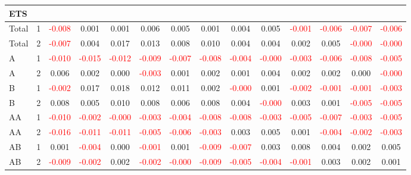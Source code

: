 \begin{table}[!htb]
{\begin{tabular}{llcccccccccccc}
\hline
ETS &  &  &  &  &  &  &  &  &  &  &  &  & \\
\hline
Total & 1 & \textcolor{red}{-0.008} & 0.001 & 0.001 & 0.006 & 0.005 & 0.001 & 0.004 & 0.005 & \textcolor{red}{-0.001} & \textcolor{red}{-0.006} & \textcolor{red}{-0.007} & \textcolor{red}{-0.006}\\
Total & 2 & \textcolor{red}{-0.007} & 0.004 & 0.017 & 0.013 & 0.008 & 0.010 & 0.004 & 0.004 & 0.002 & 0.005 & \textcolor{red}{-0.000} & \textcolor{red}{-0.000}\\
A & 1 & \textcolor{red}{-0.010} & \textcolor{red}{-0.015} & \textcolor{red}{-0.012} & \textcolor{red}{-0.009} & \textcolor{red}{-0.007} & \textcolor{red}{-0.008} & \textcolor{red}{-0.004} & \textcolor{red}{-0.000} & \textcolor{red}{-0.003} & \textcolor{red}{-0.006} & \textcolor{red}{-0.008} & \textcolor{red}{-0.005}\\
A & 2 & 0.006 & 0.002 & 0.000 & \textcolor{red}{-0.003} & 0.001 & 0.002 & 0.001 & 0.004 & 0.002 & 0.002 & 0.000 & \textcolor{red}{-0.000}\\
B & 1 & \textcolor{red}{-0.002} & 0.017 & 0.018 & 0.012 & 0.011 & 0.002 & \textcolor{red}{-0.000} & 0.001 & \textcolor{red}{-0.002} & \textcolor{red}{-0.001} & \textcolor{red}{-0.001} & \textcolor{red}{-0.003}\\
B & 2 & 0.008 & 0.005 & 0.010 & 0.008 & 0.006 & 0.008 & 0.004 & \textcolor{red}{-0.000} & 0.003 & 0.001 & \textcolor{red}{-0.005} & \textcolor{red}{-0.005}\\
AA & 1 & \textcolor{red}{-0.010} & \textcolor{red}{-0.002} & \textcolor{red}{-0.000} & \textcolor{red}{-0.003} & \textcolor{red}{-0.004} & \textcolor{red}{-0.008} & \textcolor{red}{-0.008} & \textcolor{red}{-0.003} & \textcolor{red}{-0.005} & \textcolor{red}{-0.007} & \textcolor{red}{-0.003} & \textcolor{red}{-0.005}\\
AA & 2 & \textcolor{red}{-0.016} & \textcolor{red}{-0.011} & \textcolor{red}{-0.011} & \textcolor{red}{-0.005} & \textcolor{red}{-0.006} & \textcolor{red}{-0.003} & 0.003 & 0.005 & 0.001 & \textcolor{red}{-0.004} & \textcolor{red}{-0.002} & \textcolor{red}{-0.003}\\
AB & 1 & 0.001 & \textcolor{red}{-0.004} & 0.000 & \textcolor{red}{-0.001} & 0.001 & \textcolor{red}{-0.009} & \textcolor{red}{-0.007} & 0.003 & 0.008 & 0.004 & 0.002 & 0.005\\
AB & 2 & \textcolor{red}{-0.009} & \textcolor{red}{-0.002} & 0.002 & \textcolor{red}{-0.002} & \textcolor{red}{-0.000} & \textcolor{red}{-0.009} & \textcolor{red}{-0.005} & \textcolor{red}{-0.004} & \textcolor{red}{-0.001} & 0.003 & 0.002 & 0.001\\

\end{tabular}}
\end{table}
